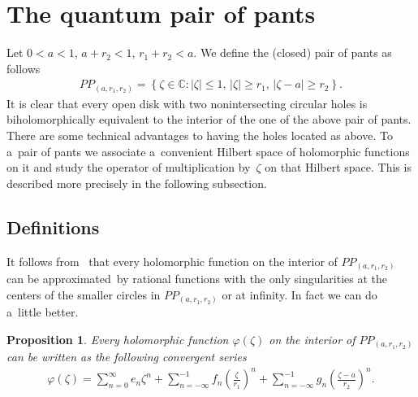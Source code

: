 \documentclass[11pt]{article}
\numberwithin{equation}{section}
\newtheorem{Proposition}[Theorem]{Proposition}
{ \theoremstyle{definition}
\newtheorem{Definition}[Theorem]{Definition}
\newtheorem{Remark}[Theorem]{Remark} }
\begin{document}
\section{The quantum pair of pants}\label{section3}

Let $0<a<1$, $a+r_2<1$, $r_1+r_2<a$.
We def\/ine the (closed) pair of pants as follows
\begin{gather*}
PP_{(a, r_1,r_2)}= \left\{\zeta\in{\mathbb C}: |\zeta| \leq 1,\, |\zeta|\geq r_1,\, |\zeta-a|\geq r_2\right\}.
\end{gather*}
It is clear that every open disk with two nonintersecting circular holes is biholomorphically equivalent to the interior
of the one of the above pair of pants.
There are some technical advantages to having the holes located as above.
To a~pair of pants we associate a~convenient Hilbert space of holomorphic functions on it and study the operator of
multiplication by~$\zeta$ on that Hilbert space.
This is described more precisely in the following subsection.

\subsection{Definitions}

It follows from~\cite{M} that every holomorphic function on the interior of $PP_{(a, r_1,r_2)}$ can be appro\-xi\-ma\-ted~by
rational functions with the only singularities at the centers of the smaller circles in $PP_{(a, r_1,r_2)}$ or at
inf\/inity.
In fact we can do a~little better.

\begin{Proposition}
Every holomorphic function $\varphi(\zeta)$ on the interior of $PP_{(a, r_1,r_2)}$ can be written as the following
convergent series
\begin{gather*}
\varphi(\zeta)=\sum\limits_{n=0}^\infty e_n\zeta^n+\sum\limits_{n=-\infty}^{-1} f_n\left(\frac{\zeta}{r_1}\right)^n
+ \sum\limits_{n=-\infty}^{-1} g_n\left(\frac{\zeta-a}{r_2}\right)^n.
\end{gather*}
\end{Proposition}
\end{document}

